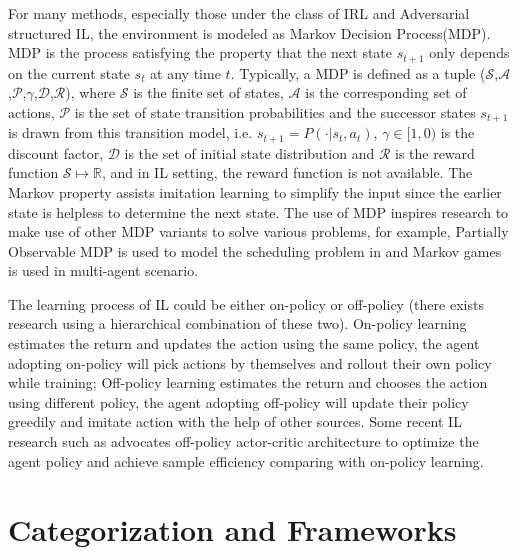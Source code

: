 \documentclass[acmsmall]{acmart}
\begin{document}
For many methods, especially those under the class of IRL and Adversarial structured IL, the environment is modeled as Markov Decision Process(MDP). MDP is the process satisfying the property that the next state $s_{t+1}$ only depends on the current state $s_t$ at any time $t$. Typically, a MDP is defined as a tuple ($\mathcal{S}$,$\mathcal{A}$,$\mathcal{P}$,$\gamma$,$\mathcal{D}$,$\mathcal{R}$), where $\mathcal{S}$ is the finite set of states, $\mathcal{A}$ is the corresponding set of actions, $\mathcal{P}$ is the set of state transition probabilities and the successor states $s_{t+1}$ is drawn from this transition model, i.e. $s_{t+1}=P(\cdot|s_t,a_t)$, $\gamma \in [1,0)$ is the discount factor, $\mathcal{D}$ is the set of initial state distribution and $\mathcal{R}$ is the reward function $\mathcal{S} \mapsto \mathbb{R}$, and in IL setting, the reward function is not available. The Markov property assists imitation learning to simplify the input since the earlier state is helpless to determine the next state. The use of MDP inspires research to make use of other MDP variants to solve various problems, for example, Partially Observable MDP is used to model the scheduling problem in \cite{wang2021minimizing} and Markov games is used in multi-agent scenario\cite{songMultiAgentGenerativeAdversarial2018}. 

The learning process of IL could be either on-policy or off-policy (there exists research using a hierarchical combination of these two\cite{chenLearningCheating2019}). On-policy learning estimates the return and updates the action using the same policy, the agent adopting on-policy will pick actions by themselves and rollout their own policy while training; Off-policy learning estimates the return and chooses the action using different policy, the agent adopting off-policy will update their policy greedily and imitate action with the help of other sources. Some recent IL research such as \cite{Zuo2020offpolicyRAIL,sasaki2018sample,blonde2019sample} advocates off-policy actor-critic architecture to optimize the agent policy and achieve sample efficiency comparing with on-policy learning.

\section{Categorization and Frameworks} \label{cat_fra}
\end{document}
